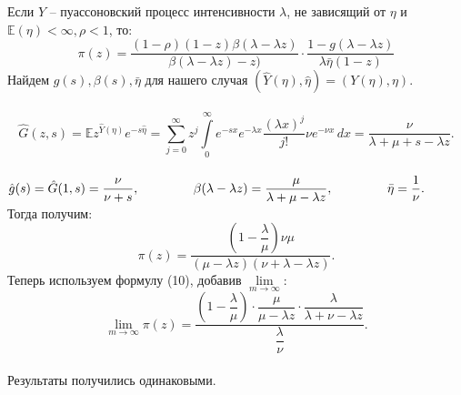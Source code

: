 \documentclass[12pt]{article}
\begin{document}
Если $Y$ -- пуассоновский процесс интенсивности $\lambda$, не зависящий от $\eta$ и $\mathbb{E}(\eta) < \infty, \rho <1$, то:
$$ \pi (z) = \dfrac{(1-\rho)(1-z)\beta(\lambda -\lambda z)}{\beta(\lambda -\lambda z)-z)}\cdot\dfrac{1-g(\lambda -\lambda z)}{\lambda\bar{\eta}(1-z)}$$
Найдем $g(s), \beta(s), \bar{\eta}$ для нашего случая $ (\hat{Y}(\eta), \hat{\eta}) = (Y(\eta), \eta)$.\\
\\
$$ \hat{G}(z,s) =\mathbb{E}z^{\hat{Y}(\eta)}e^{-s\hat{\eta}} = \sum\limits^\infty_{j=0}z^j\int\limits^\infty_0 e^{-sx}e^{-\lambda x} \dfrac{(\lambda x)^j}{j!} \nu e^{-\nu x}\, dx = \dfrac{\nu}{\lambda + \mu+ s -\lambda z}.$$\\
$ \hat{g}(s)=\hat{G}(1,s) = \dfrac{\nu}{\nu+s},\hspace{1.5cm}\beta(\lambda-\lambda z)= \dfrac{\mu}{\lambda+\mu-\lambda z},\hspace{1.5cm}\bar{\eta}=\dfrac{1}{\nu}.$\\
Тогда получим:\\

$$ \pi (z) = \dfrac{\left(1-\dfrac{\lambda}{\mu}\right)\nu\mu}{(\mu-\lambda z)(\nu+\lambda -\lambda z)}.$$
Теперь используем формулу (10), добавив $\lim\limits_{m \to \infty}$:
$$\lim\limits_{m \to \infty}\pi(z)=\dfrac{\left(1-\dfrac{\lambda}{\mu}\right)\cdot\dfrac{\mu}{\mu-\lambda z}\cdot\dfrac{\lambda}{\lambda+\nu-\lambda z}}{\dfrac{\lambda}{\nu}}. $$
\\
Результаты получились одинаковыми.
\end{document}
